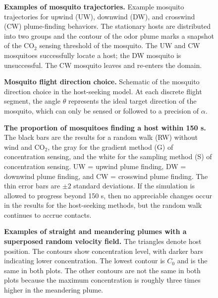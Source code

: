 \documentclass[10pt]{article}
\begin{document}
\begin{figure}[!htp]
\caption{
{\bf Examples of mosquito trajectories. } Example mosquito trajectories for upwind (UW), downwind (DW), and crosswind (CW) plume-finding behaviors. The stationary hosts are distributed into two groups and the contour of the odor plume marks a snapshot of the $\mbox{CO}_2$ sensing threshold of the mosquito. The UW and CW mosquitoes successfully locate a host; the DW mosquito is unsuccessful. The CW mosquito leaves and re-enters the domain. %
}
\label{MosquitoTraj}
\end{figure}

\begin{figure}[!htp]
\caption{
{\bf Mosquito flight direction choice. } Schematic of the mosquito direction choice in the host-seeking model. At each discrete flight segment, the angle $\theta$ represents the ideal target direction of the mosquito, which can only be sensed or followed to a precision of $\alpha$.
}
\label{MosquitoDirChoice}
\end{figure}

\begin{figure}[!htp]
\caption{
{\bf The proportion of mosquitoes finding a host within 150 s.} The black bars are the results for a random walk (RW) without wind and $\mbox{CO}_2$, the gray for the gradient method (G) of concentration sensing, and the white for the sampling method (S) of concentration sensing. UW = upwind plume finding, DW = downwind plume finding, and CW = crosswind plume finding. The thin error bars are $\pm 2$ standard deviations. If the simulation is allowed to progress beyond 150 s, then no appreciable changes occur in the results for the host-seeking methods, but the random walk continues to accrue contacts. }
\label{fig:rulecomp}
\end{figure}


\begin{figure}[!htp]
\caption{
{\bf Examples of straight and meandering plumes with a superposed random velocity field.}  The triangles denote host position. The contours show concentration level, with darker bars indicating lower concentration. The lowest contour is $C_0$ and is the same in both plots. The other contours are not the same in both plots because the maximum concentration is roughly three times higher in the meandering plume.}
			\label{fig:Meander}
\end{figure}
\end{document}
